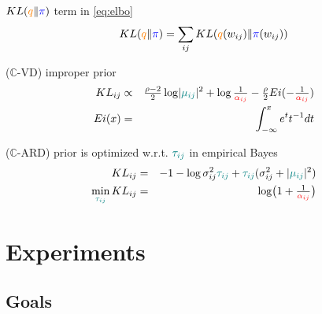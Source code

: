 \documentclass{beamer}
\newcommand{\real}{\mathbb{R}}
\newcommand{\cplx}{\mathbb{C}}
\begin{document}
\begin{frame}[c]{\insertsection}

  $\mathop{KL}({\color{orange} q} \| {\color{blue} \pi})$ term in \eqref{eq:elbo}
  \begin{equation*}
    \mathop{KL}({\color{orange} q} \| {\color{blue} \pi})
      = \sum_{ij} \mathop{KL}({\color{orange} q}(w_{ij}) \| {\color{blue} \pi}(w_{ij}))
  \end{equation*}

  \bigskip
  ($\cplx$-VD) improper prior
  \begin{eqnarray*}
    \mathop{KL}\nolimits_{ij}
      &\propto&
        \tfrac{\rho - 2}2 \log \lvert {\color{teal} \mu_{ij}} \rvert^2
        + \log \tfrac1{{\color{red} \alpha_{ij}}}
        - \tfrac\rho2 Ei( - \tfrac1{{\color{red} \alpha_{ij}}})
      \\
    Ei(x) &=& \int_{-\infty}^x e^t t^{-1} dt
  \end{eqnarray*}

  \bigskip
  ($\cplx$-ARD) prior is optimized w.r.t. ${\color{teal} \tau_{ij}}$ in empirical Bayes
  \begin{eqnarray*}
    \mathop{KL}\nolimits_{ij}
      &=& -1
        - \log \sigma^2_{ij} {\color{teal} \tau_{ij}}
        + {\color{teal} \tau_{ij}} (\sigma^2_{ij} + \lvert {\color{teal} \mu_{ij}} \rvert^2)
      \\
    \min_{{\color{teal} \tau_{ij}}} \mathop{KL}\nolimits_{ij}
      &=& \log \bigl( 1 + \tfrac1{{\color{red} \alpha_{ij}}} \bigr)
  \end{eqnarray*}

\end{frame}



\section{Experiments} %
\label{sec:experiments}

\subsection{Goals} %
\label{sub:goals}
\end{document}
